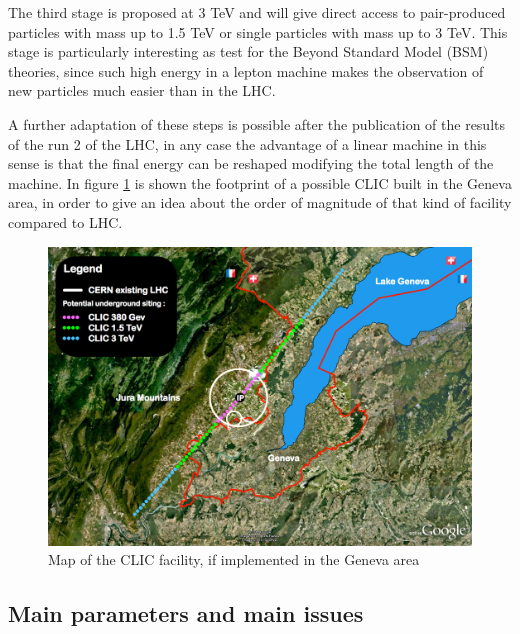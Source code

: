 The third stage is proposed at 3 TeV and will give direct access to pair-produced particles with mass up to 1.5 TeV or single particles with mass up to 3 TeV. This stage is particularly interesting as test for the Beyond Standard Model (BSM) theories, since such high energy in a lepton machine makes the observation of new particles much easier than in the LHC.

A further adaptation of these steps is possible after the publication of the results of the run 2 of the LHC, in any case the advantage of a linear machine in this sense is that the final energy can be reshaped modifying the total length of the machine. In figure \ref{CLIC_map} is shown the footprint of a possible CLIC built in the Geneva area, in order to give an idea about the order of magnitude of that kind of facility compared to LHC.

\begin{figure}[h]
\centering

\includegraphics[scale=0.3]{pictures/CLIC_map}
\caption{Map of the CLIC facility, if implemented in the Geneva area}
\label{CLIC_map}

\end{figure}


\subsection{Main parameters and main issues}


